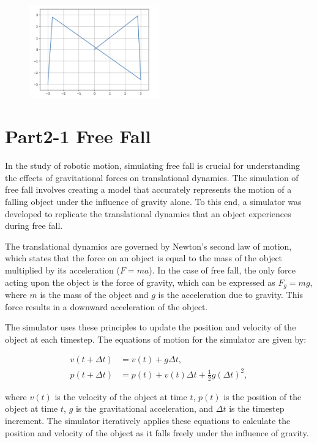 \documentclass[letterpaper, 10 pt, conference]{ieeeconf}  %
\begin{document}
\begin{figure}[htbp]
    \centering
    \includegraphics[width=0.5\textwidth]{image2.png}
\end{figure}

\section{Part2-1 Free Fall}
In the study of robotic motion, simulating free fall is crucial for understanding the effects of gravitational forces on translational dynamics. The simulation of free fall involves creating a model that accurately represents the motion of a falling object under the influence of gravity alone. To this end, a simulator was developed to replicate the translational dynamics that an object experiences during free fall.

The translational dynamics are governed by Newton's second law of motion, which states that the force on an object is equal to the mass of the object multiplied by its acceleration (\( F = ma \)). In the case of free fall, the only force acting upon the object is the force of gravity, which can be expressed as \( F_g = mg \), where \( m \) is the mass of the object and \( g \) is the acceleration due to gravity. This force results in a downward acceleration of the object.

The simulator uses these principles to update the position and velocity of the object at each timestep. The equations of motion for the simulator are given by:

\begin{align*}
v(t+\Delta t) &= v(t) + g\Delta t, \\
p(t+\Delta t) &= p(t) + v(t)\Delta t + \frac{1}{2}g(\Delta t)^2,
\end{align*}

where \( v(t) \) is the velocity of the object at time \( t \), \( p(t) \) is the position of the object at time \( t \), \( g \) is the gravitational acceleration, and \( \Delta t \) is the timestep increment. The simulator iteratively applies these equations to calculate the position and velocity of the object as it falls freely under the influence of gravity.
\end{document}
